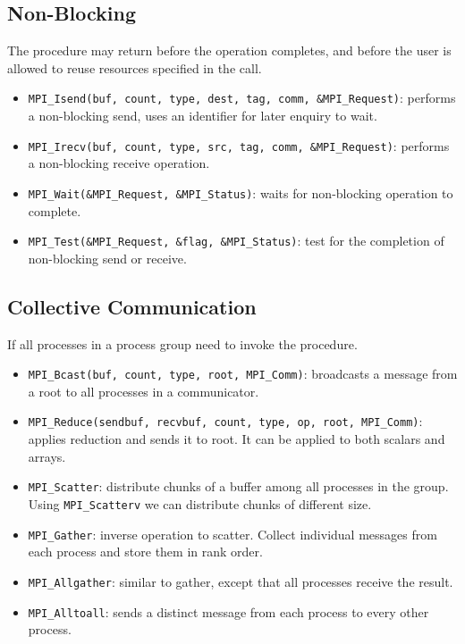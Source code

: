 \subsection*{Non-Blocking}
The procedure may return before the operation completes, and before the user is allowed to reuse resources specified in the call.
\begin{itemize}
    \item \texttt{MPI\_Isend(buf, count, type, dest, tag, comm, \&MPI\_Request)}: performs a non-blocking send, uses an identifier for later enquiry to wait.
    \item \texttt{MPI\_Irecv(buf, count, type, src, tag, comm, \&MPI\_Request)}: performs a non-blocking receive operation.
    \item \texttt{MPI\_Wait(\&MPI\_Request, \&MPI\_Status)}: waits for non-blocking operation to complete.
    \item \texttt{MPI\_Test(\&MPI\_Request, \&flag, \&MPI\_Status)}: test for the completion of non-blocking send or receive.
\end{itemize}

\subsection{Collective Communication}
If all processes in a process group need to invoke the procedure.
\begin{itemize}
    \item \texttt{MPI\_Bcast(buf, count, type, root, MPI\_Comm)}: broadcasts a message from a root to all processes in a communicator.
    \item \texttt{MPI\_Reduce(sendbuf, recvbuf, count, type, op, root, MPI\_Comm)}: applies reduction and sends it to root.
        It can be applied to both scalars and arrays.
    \item \texttt{MPI\_Scatter}: distribute chunks of a buffer among all processes in the group.
        Using \texttt{MPI\_Scatterv} we can distribute chunks of different size.
    \item \texttt{MPI\_Gather}: inverse operation to scatter.
        Collect individual messages from each process and store them in rank order.
    \item \texttt{MPI\_Allgather}: similar to gather, except that all processes receive the result.
    \item \texttt{MPI\_Alltoall}: sends a distinct message from each process to every other process.
\end{itemize}
